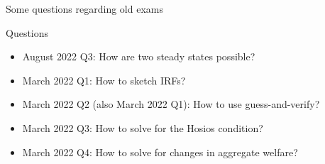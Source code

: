 \documentclass[9pt]{beamer}
\newcommand{\bit}{\begin{itemize}}
\newcommand{\eit}{\end{itemize}}
\begin{document}
\begin{frame}

\begin{center}
	\huge Some questions regarding old exams \normalfont
\end{center}

\end{frame}


\begin{frame}{Questions}

\bit
\setlength\itemsep{1em}
\item August 2022 Q3: How are two steady states possible?

\item March 2022 Q1: How to sketch IRFs?

\item March 2022 Q2 (also March 2022 Q1): How to use guess-and-verify?

\item March 2022 Q3: How to solve for the Hosios condition? 

\item March 2022 Q4: How to solve for changes in aggregate welfare? 

\eit


\end{frame}
\end{document}
